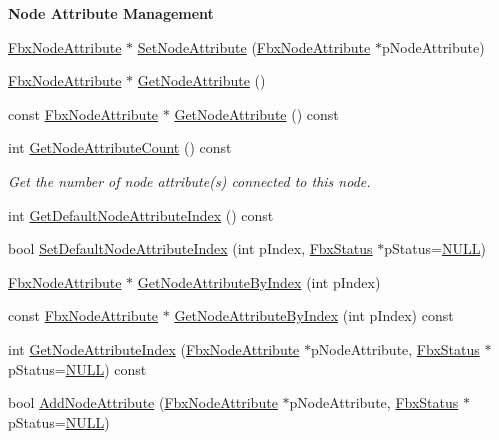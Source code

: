 \begin{Indent}\textbf{ Node Attribute Management}\par
\begin{DoxyCompactItemize}
\item 
\hyperlink{class_fbx_node_attribute}{Fbx\+Node\+Attribute} $\ast$ \hyperlink{class_fbx_node_adb194a043dd1ccf3bc1e3bda520dc97a}{Set\+Node\+Attribute} (\hyperlink{class_fbx_node_attribute}{Fbx\+Node\+Attribute} $\ast$p\+Node\+Attribute)
\item 
\hyperlink{class_fbx_node_attribute}{Fbx\+Node\+Attribute} $\ast$ \hyperlink{class_fbx_node_a9a64977e72b4da5dcbd80673c444b848}{Get\+Node\+Attribute} ()
\item 
const \hyperlink{class_fbx_node_attribute}{Fbx\+Node\+Attribute} $\ast$ \hyperlink{class_fbx_node_a50143654f42152678c11f0c82cd028c2}{Get\+Node\+Attribute} () const
\item 
int \hyperlink{class_fbx_node_a3d39e3db38ce79ab0d7196fe4388ec64}{Get\+Node\+Attribute\+Count} () const
\begin{DoxyCompactList}\small\item\em Get the number of node attribute(s) connected to this node. \end{DoxyCompactList}\item 
int \hyperlink{class_fbx_node_adbeba237f641a5448b14a32e41f18cd9}{Get\+Default\+Node\+Attribute\+Index} () const
\item 
bool \hyperlink{class_fbx_node_a4c4ec74ab7ff59cad09c0c26e71e4949}{Set\+Default\+Node\+Attribute\+Index} (int p\+Index, \hyperlink{class_fbx_status}{Fbx\+Status} $\ast$p\+Status=\hyperlink{fbxarch_8h_a070d2ce7b6bb7e5c05602aa8c308d0c4}{N\+U\+LL})
\item 
\hyperlink{class_fbx_node_attribute}{Fbx\+Node\+Attribute} $\ast$ \hyperlink{class_fbx_node_a3948db592a4660170b284ac3aa203481}{Get\+Node\+Attribute\+By\+Index} (int p\+Index)
\item 
const \hyperlink{class_fbx_node_attribute}{Fbx\+Node\+Attribute} $\ast$ \hyperlink{class_fbx_node_a7967e16e4540fe95e57f2ad7ad76578d}{Get\+Node\+Attribute\+By\+Index} (int p\+Index) const
\item 
int \hyperlink{class_fbx_node_a95b33d65d88ae6b759bb5ae680ba5454}{Get\+Node\+Attribute\+Index} (\hyperlink{class_fbx_node_attribute}{Fbx\+Node\+Attribute} $\ast$p\+Node\+Attribute, \hyperlink{class_fbx_status}{Fbx\+Status} $\ast$p\+Status=\hyperlink{fbxarch_8h_a070d2ce7b6bb7e5c05602aa8c308d0c4}{N\+U\+LL}) const
\item 
bool \hyperlink{class_fbx_node_afae7fc1a08dd48e8fa9e768ec5776f08}{Add\+Node\+Attribute} (\hyperlink{class_fbx_node_attribute}{Fbx\+Node\+Attribute} $\ast$p\+Node\+Attribute, \hyperlink{class_fbx_status}{Fbx\+Status} $\ast$p\+Status=\hyperlink{fbxarch_8h_a070d2ce7b6bb7e5c05602aa8c308d0c4}{N\+U\+LL})

\end{DoxyCompactItemize}
\end{Indent}
